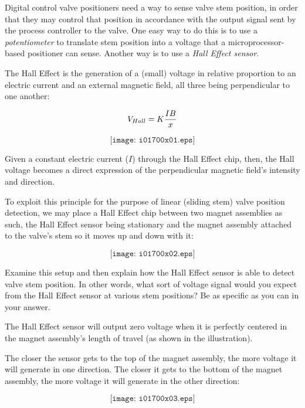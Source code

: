 

Digital control valve positioners need a way to sense valve stem position, in order that they may control that position in accordance with the output signal sent by the process controller to the valve.  One easy way to do this is to use a {\it potentiometer} to translate stem position into a voltage that a microprocessor-based positioner can sense.  Another way is to use a {\it Hall Effect sensor}.

The Hall Effect is the generation of a (small) voltage in relative proportion to an electric current and an external magnetic field, all three being perpendicular to one another:

$$V_{Hall} = K {IB \over x}$$

$$\texttt{[image: i01700x01.eps]}$$

Given a constant electric current ($I$) through the Hall Effect chip, then, the Hall voltage becomes a direct expression of the perpendicular magnetic field's intensity and direction.

\filbreak

To exploit this principle for the purpose of linear (sliding stem) valve position detection, we may place a Hall Effect chip between two magnet assemblies as such, the Hall Effect sensor being stationary and the magnet assembly attached to the valve's stem so it moves up and down with it:

$$\texttt{[image: i01700x02.eps]}$$

Examine this setup and then explain how the Hall Effect sensor is able to detect valve stem position.  In other words, what sort of voltage signal would you expect from the Hall Effect sensor at various stem positions?  Be as specific as you can in your answer.







The Hall Effect sensor will output zero voltage when it is perfectly centered in the magnet assembly's length of travel (as shown in the illustration).







The closer the sensor gets to the top of the magnet assembly, the more voltage it will generate in one direction.  The closer it gets to the bottom of the magnet assembly, the more voltage it will generate in the other direction:

$$\texttt{[image: i01700x03.eps]}$$




